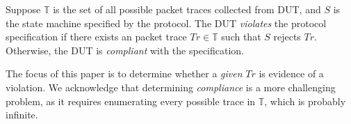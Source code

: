 \begin{definition}
  Suppose $\mathbb{T}$ is the set of all possible packet traces collected from
  DUT, and $S$ is the state machine specified by the protocol. The DUT
  \textit{violates} the protocol specification if there exists an
  packet trace $Tr \in \mathbb{T}$ such that $S$ rejects $Tr$.
  Otherwise, the DUT is \textit{compliant} with the specification.
\end{definition}

The focus of this paper is to determine whether a \textit{given} $Tr$ is
evidence of a violation.
%
We acknowledge that determining \textit{compliance} is a more challenging
problem, as it requires enumerating every possible trace in $\mathbb{T}$, which
is probably infinite.
